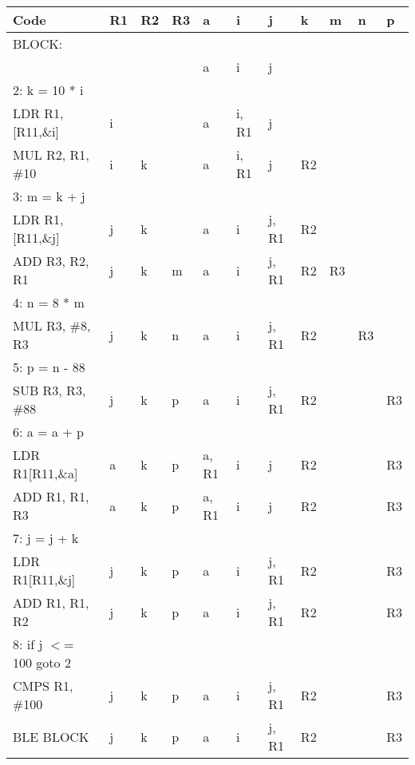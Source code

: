 \documentclass[11pt, oneside]{article}   	%
\begin{document}
\begin{center}
    \begin{tabular}{| l | l | l | l | l | l | l | l | l | l | l |}
    \hline
    Code & R1 & R2 & R3 & a & i & j & k & m & n & p \\ \hline
    BLOCK: & & & & & & & & & & \\ \hline
    & & & & a & i & j & & & & \\ \hline
    2: k = 10 * i & & & & & & & & & & \\ \hline
    LDR R1,[R11,\&i] & i & & & a & i, R1 & j & & & & \\ \hline
    MUL R2, R1, \#10 & i & k & & a & i, R1 & j & R2 & & & \\ \hline
    3: m = k + j & & & & & & & & & & \\ \hline
    LDR R1,[R11,\&j] & j & k & & a & i & j, R1 & R2 & & & \\ \hline
    ADD R3, R2, R1 & j & k & m & a & i & j, R1 & R2 & R3 & & \\ \hline
    4: n = 8 * m & & & & & & & & & & \\ \hline
    MUL R3, \#8, R3 & j & k & n & a & i & j, R1 & R2 & & R3 & \\ \hline
    5: p = n - 88 & & & & & & & & & & \\ \hline
    SUB R3, R3, \#88 & j & k & p & a & i & j, R1 & R2 & & & R3 \\ \hline
    6: a = a + p & & & & & & & & & & \\ \hline
    LDR R1[R11,\&a] & a & k & p & a, R1 & i & j & R2 & & & R3 \\ \hline
    ADD R1, R1, R3 & a & k & p & a, R1 & i & j & R2 & & & R3 \\ \hline
    7: j = j + k & & & & & & & & & & \\ \hline
    LDR R1[R11,\&j] & j & k & p & a & i & j, R1 & R2 & & & R3 \\ \hline
    ADD R1, R1, R2 & j & k & p & a & i & j, R1 & R2 & & & R3 \\ \hline
    8: if j $<$= 100 goto 2 & & & & & & & & & & \\ \hline
    CMPS R1, \#100 & j & k & p & a & i & j, R1 & R2 & & & R3 \\ \hline
    BLE BLOCK & j & k & p & a & i & j, R1 & R2 & & & R3 \\ \hline
    \end{tabular}
\end{center}
\end{document}
